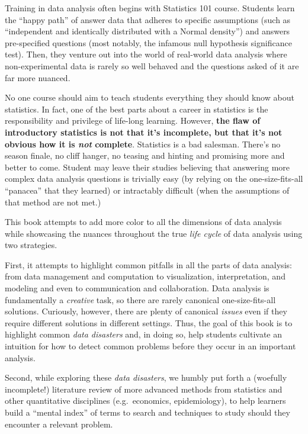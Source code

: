 \documentclass[
]{krantz}
\begin{document}
Training in data analysis often begins with Statistics 101 course.
Students learn the ``happy path'' of answer data that adheres to specific assumptions (such as ``independent and identically distributed with a Normal density'') and answers pre-specified questions (most notably, the infamous null hypothesis significance test).
Then, they venture out into the world of real-world data analysis where non-experimental data is rarely so well behaved and the questions asked of it are far more nuanced.

No one course should aim to teach students everything they should know about statistics.
In fact, one of the best parts about a career in statistics is the responsibility and privilege of life-long learning.
However, \textbf{the flaw of introductory statistics is not that it's incomplete, but that it's not obvious how it is \emph{not} complete}.
Statistics is a bad salesman.
There's no season finale, no cliff hanger, no teasing and hinting and promising more and better to come.
Student may leave their studies believing that answering more complex data analysis questions is trivially easy (by relying on the one-size-fits-all ``panacea'' that they learned) or intractably difficult (when the assumptions of that method are not met.)

This book attempts to add more color to all the dimensions of data analysis while showcasing the nuances throughout the true \emph{life cycle} of data analysis using two strategies.

First, it attempts to highlight common pitfalls in all the parts of data analysis: from data management and computation to visualization, interpretation, and modeling and even to communication and collaboration.
Data analysis is fundamentally a \emph{creative} task, so there are rarely canonical one-size-fits-all solutions.
Curiously, however, there are plenty of canonical \emph{issues} even if they require different solutions in different settings.
Thus, the goal of this book is to highlight common \emph{data disasters} and, in doing so, help students cultivate an intuition for how to detect common problems before they occur in an important analysis.

Second, while exploring these \emph{data disasters}, we humbly put forth a (woefully incomplete!) literature review of more advanced methods from statistics and other quantitative disciplines (e.g.~economics, epidemiology), to help learners build a ``mental index'' of terms to search and techniques to study should they encounter a relevant problem.
\end{document}
